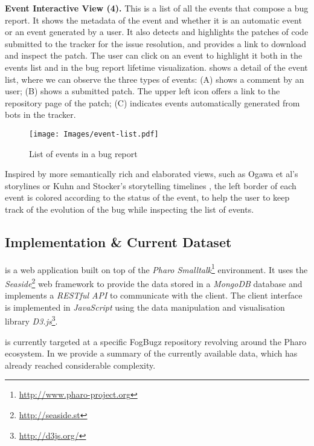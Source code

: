 \textbf{Event Interactive View (4).} This is a list of all the events that compose a bug report. It shows the metadata of the event and whether it is an automatic event or an event generated by a user. It also detects and highlights the patches of code submitted to the tracker for the issue resolution, and provides a link to download and inspect the patch. The user can click on an event to highlight it both in the events list and in the bug report lifetime visualization.  shows a detail of the event list, where we can observe the three types of events: (A) shows a comment by an user; (B) shows a submitted patch. The upper left icon offers a link to the repository page of the patch; (C) indicates events automatically generated from bots in the tracker. \\
\begin{figure}[ht]
\begin{center}
\texttt{[image: Images/event-list.pdf]}
\caption{List of events in a bug report}
\label{fig-event-list}
\end{center}
\end{figure}
\indent{}Inspired by more semantically rich and elaborated views, such as Ogawa et al's storylines \cite{Ogaw2010a} or Kuhn and Stocker's storytelling timelines \cite{Kuhn2012a}, the left border of each event is colored according to the status of the event, to help the user to keep track of the evolution of the bug while inspecting the list of events.

\subsection{Implementation \& Current Dataset}

\ib is a web application built on top of the \textit{Pharo Smalltalk}\footnote{\url{http://www.pharo-project.org}} environment. It uses the \textit{Seaside}\footnote{\url{http://seaside.st}} web framework to provide the data stored in a \textit{MongoDB} database and implements a \textit{RESTful API} to communicate with the client. The client interface is implemented in \textit{JavaScript} using the data manipulation and visualisation library \textit{D3.js}\footnote{\url{http://d3js.org/}}.

\ib is currently targeted at a specific FogBugz repository revolving around the Pharo ecosystem. In  we provide a summary of the currently available data, which has already reached considerable complexity.


